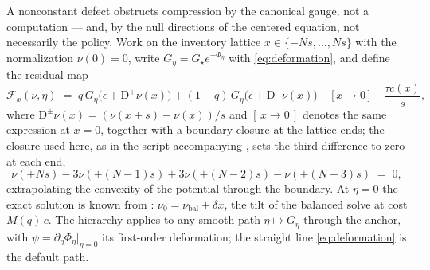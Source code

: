 \documentclass[11pt]{article}
\begin{document}
A nonconstant defect obstructs compression by the canonical gauge, not a computation --- and, by the null directions of the centered equation, not necessarily the policy. Work on the inventory lattice $x \in \{-Ns, \dots, Ns\}$ with the normalization $\nu(0) = 0$, write $G_\eta = G_\star e^{-\Phi_\eta}$ with \eqref{eq:deformation}, and define the residual map
\begin{equation}
\mathcal F_x(\nu, \eta) \;=\; q\,G_\eta\big(\epsilon + \mathrm{D}^{+}\nu(x)\big) + (1-q)\,G_\eta\big(\epsilon + \mathrm{D}^{-}\nu(x)\big) - \big[\,x \to 0\,\big] - \frac{\tau c(x)}{s},
\label{eq:residual}
\end{equation}
where $\mathrm{D}^{\pm}\nu(x) = (\nu(x\pm s) - \nu(x))/s$ and $[\,x\to 0\,]$ denotes the same expression at $x = 0$, together with a boundary closure at the lattice ends; the closure used here, as in the script accompanying \citet{cotton2026skew}, sets the third difference to zero at each end,
\[
\nu(\pm N s) - 3\nu(\pm(N-1)s) + 3\nu(\pm(N-2)s) - \nu(\pm(N-3)s) \;=\; 0,
\]
extrapolating the convexity of the potential through the boundary. At $\eta = 0$ the exact solution is known from \citet{cotton2026skew}: $\nu_0 = \nu_{\mathrm{bal}} + \delta x$, the tilt of the balanced solve at cost $M(q)\,c$. The hierarchy applies to any smooth path $\eta \mapsto G_\eta$ through the anchor, with $\psi = \partial_\eta \Phi_\eta|_{\eta=0}$ its first-order deformation; the straight line \eqref{eq:deformation} is the default path.
\end{document}
